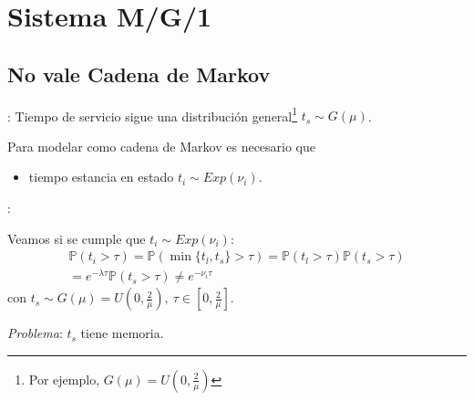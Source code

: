 \documentclass[xcolor={x11names}]{beamer}
\begin{document}
\section{Sistema M/G/1}
\subsection{No vale Cadena de Markov}
\begin{frame}{\secname: \subsecname}
    Tiempo de servicio sigue una distribución
    general\footnote{Por ejemplo,
    $G(\mu)=U(0,\tfrac{2}{\mu})$}
    $t_s\sim G(\mu)$.

    \begin{figure}
        
    \end{figure}

    \vfill
    Para modelar como cadena de Markov
    es necesario que
    \begin{itemize}
        \item tiempo estancia en estado
            $t_i\sim Exp(\nu_i)$.
    \end{itemize}
\end{frame}



\begin{frame}{\secname: \subsecname}
    \begin{figure}
        
    \end{figure}

    \vfill
    Veamos si se cumple que $t_i\sim Exp(\nu_i)$:
    \begin{multline}
        \mathbb{P}(t_i>\tau) =
        \mathbb{P}(\min\{t_l,t_s\}>\tau)=
        \mathbb{P}(t_l>\tau)
        \mathbb{P}(t_s>\tau)\\
        = 
        e^{-\lambda\tau} \mathbb{P}(t_s>\tau) \neq e^{-\nu_i \tau}
    \end{multline}
    con $t_s\sim G(\mu)=U\left(0,\tfrac{2}{\mu}\right),\
    \tau\in\left[0,\tfrac{2}{\mu}\right]$.

    \emph{Problema}: $t_s$ tiene memoria.
\end{frame}
\end{document}
